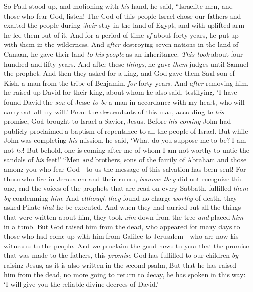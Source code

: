 \begin{biblechapter}
\verse So Paul stood up, and motioning with \textit{his} hand, he said, “Israelite men, and those who fear God, listen!
\verse The God of this people Israel chose our fathers and exalted the people during \textit{their} stay in the land of Egypt, and with uplifted arm he led them out of it.
\verse And for a period of time \textit{of} about forty years, he put up with them in the wilderness.
\verse And \textit{after} destroying seven nations in the land of Canaan, he gave their land \textit{to his people} as an inheritance.
\verse \textit{This took} about four hundred and fifty years. And after these \textit{things}, he gave \textit{them} judges until Samuel the prophet.
\verse And then they asked for a king, and God gave them Saul son of Kish, a man from the tribe of Benjamin, \textit{for} forty years.
\verse And \textit{after} removing him, he raised up David for their king, about whom he also said, testifying, ‘I have found David the \textit{son} of Jesse \textit{to be} a man in accordance with my heart, who will carry out all my will.’
\verse From the descendants of this man, according to \textit{his} promise, God brought to Israel a Savior, Jesus.
\verse Before \textit{his coming} John had publicly proclaimed a baptism of repentance to all the people of Israel.
\verse But while John was completing \textit{his} mission, he said, ‘What do you suppose me to be? I am not \textit{he}! But behold, one is coming after me of whom I am not worthy to untie the sandals of \textit{his} feet!’
\verse “Men \textit{and} brothers, sons of the family of Abraham and those among you who fear God—to us the message of this salvation has been sent!
\verse For those who live in Jerusalem and their rulers, \textit{because they} did not recognize this one, and the voices of the prophets that are read on every Sabbath, fulfilled \textit{them} \textit{by} condemning \textit{him}.
\verse And \textit{although they} found no charge \textit{worthy} of death, they asked Pilate \textit{that} he be executed.
\verse And when they had carried out all the things that were written about him, they took \textit{him} down from the tree \textit{and} placed \textit{him} in a tomb.
\verse But God raised him from the dead,
\verse who appeared for many days to those who had come up with him from Galilee to Jerusalem—who are now his witnesses to the people.
\verse And we proclaim the good news to you: that the promise that was made to the fathers,
\verse this \textit{promise} God has fulfilled to our children \textit{by} raising Jesus, as it is also written in the second psalm,
\verse But that he has raised him from the dead, no more going to return to decay, he has spoken in this way: ‘I will give you the reliable divine decrees of David.’

\end{biblechapter}
